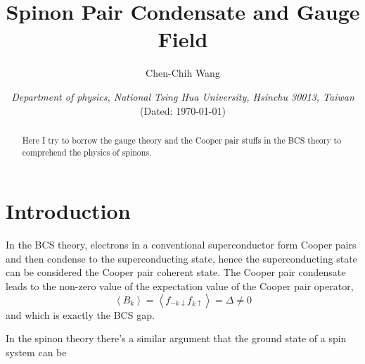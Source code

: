 \documentclass[12font]{article}
\title{\textbf{ Spinon Pair Condensate and Gauge Field }}
\author{Chen-Chih Wang  }
\date{\textit{Department of physics, National Tsing Hua University, Hsinchu 30013, Taiwan} \\ (Dated: \today)}
\newcommand{\anglelr}[1]{\left\langle #1 \right\rangle}
\begin{document}
\maketitle



\begin{abstract}
  Here I try to borrow the gauge theory and the Cooper pair stuffs in the BCS theory to comprehend the physics of spinons.
\end{abstract}

\section{Introduction}
In the BCS theory, electrons in a conventional superconductor form Cooper pairs and then condense to the superconducting state, hence the superconducting state can be considered the Cooper pair coherent state. The Cooper pair condensate leads to the non-zero value of the expectation value of the Cooper pair operator,
\[\anglelr{B_k} = \anglelr{f_{-k\downarrow}f_{k\uparrow}} = \Delta \neq 0\]
and which is exactly the BCS gap. 

In the spinon theory there's a similar argument that the ground state of a spin system can be
\end{document}
